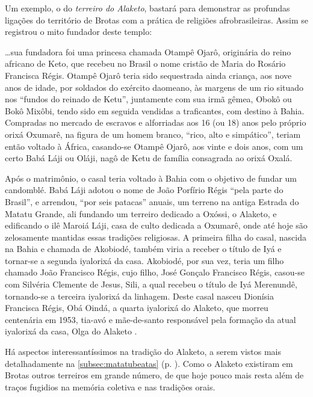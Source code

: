 Um exemplo, o do \textit{terreiro do Alaketo}, bastará para demonstrar as profundas ligações do território de Brotas com a prática de religiões afrobrasileiras. Assim se registrou o mito fundador deste templo:

\begin{citacao}
\dots sua fundadora foi uma princesa chamada Otampê Ojarô, originária do reino africano de Keto, que recebeu no Brasil o nome cristão de Maria do Rosário Francisca Régis. Otampê Ojarô teria sido sequestrada ainda criança, aos nove anos de idade, por soldados do exército daomeano, às margens de um rio situado nos ``fundos do reinado de Ketu'', juntamente com sua irmã gêmea, Obokô ou Bokô Mixôbi, tendo sido em seguida vendidas a traficantes, com destino à Bahia. Compradas no mercado de escravos e alforriadas aos 16 (ou 18) anos pelo próprio orixá Oxumarê, na figura de um homem branco, ``rico, alto e simpático'', teriam então voltado à África, casando-se Otampê Ojarô, aos vinte e dois anos, com um certo Babá Láji ou Oláji, nagô de Ketu de família consagrada ao orixá Oxalá.

Após o matrimônio, o casal teria voltado à Bahia com o objetivo de fundar um candomblé. Babá Láji adotou o nome de João Porfírio Régis ``pela parte do Brasil'', e arrendou, ``por seis patacas'' anuais, um terreno na antiga Estrada do Matatu Grande, ali fundando um terreiro dedicado a Oxóssi, o Alaketo, e edificando o ilê Maroiá Láji, casa de culto dedicada a Oxumarê, onde até hoje são zelosamente mantidas essas tradições religiosas. A primeira filha do casal, nascida na Bahia e chamada de Akobiodé, também viria a receber o título de Iyá e tornar-se a segunda iyalorixá da casa. Akobiodé, por sua vez, teria um filho chamado João Francisco Régis, cujo filho, José Gonçalo Francisco Régis, casou-se com Silvéria Clemente de Jesus, Sili, a qual recebeu o título de Iyá Merenundê, tornando-se a terceira iyalorixá da linhagem. Deste casal nasceu Dionísia Francisca Régis, Obá Oindá, a quarta iyalorixá do Alaketo, que morreu centenária em 1953, tia-avó e mãe-de-santo responsável pela formação da atual iyalorixá da casa, Olga do Alaketo \cite[p.~345-346]{silveira_alaketo_2003}.
\end{citacao}

Há aspectos interessantíssimos na tradição do Alaketo, a serem vistos mais detalhadamente na \autoref{subsec:matatubeatas} (p. \pageref{subsec:matatubeatas}). Como o Alaketo existiram em Brotas outros terreiros em grande número, de que hoje pouco mais resta além de traços fugidios na memória coletiva e nas tradições orais.

